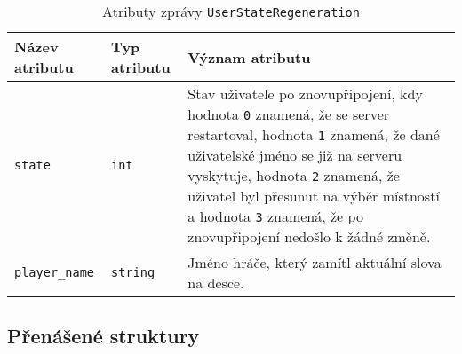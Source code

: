 \documentclass[12pt, a4paper]{article}
\begin{document}
\begin{center}
		\begin{table}[!ht]
		     \caption{Atributy zprávy \texttt{UserStateRegeneration}}
		\begin{tabularx}{\textwidth}{|l|l|X|}
			\hline
			\textbf{Název atributu} & \textbf{Typ atributu} & \textbf{Význam atributu} \\ 
			\hline
			\texttt{state}          &\texttt{int}&Stav uživatele po znovupřipojení, kdy hodnota \texttt{0} znamená, že se server restartoval, hodnota \texttt{1} znamená, že dané uživatelské jméno se již na serveru vyskytuje, hodnota \texttt{2} znamená, že uživatel byl přesunut na výběr místností a hodnota \texttt{3} znamená, že po znovupřipojení nedošlo k žádné změně.\\
			\hline
			\texttt{player\_name}          &\texttt{string}&Jméno hráče, který zamítl aktuální slova na desce.\\
			\hline
		\end{tabularx}
		\end{table}
\end{center}  	
\subsection{Přenášené struktury}
\end{document}
